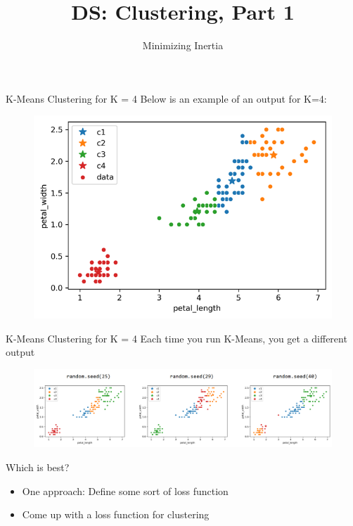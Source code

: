 \documentclass[aspectratio=169]{../latex_main/tntbeamer}  %
\title[Introduction]{DS: Clustering, Part 1}
\subtitle{Minimizing Inertia}
\begin{document}
	
	\maketitle
	\begin{frame}{K-Means Clustering for K = 4}
	    Below is an example of an output for K=4:
	    \begin{figure}
	        \centering
	        \includegraphics[scale=.75]{Bild21}
	    \end{figure}
	\end{frame}
	
	
	\begin{frame}{K-Means Clustering for K = 4}
	    Each time you run K-Means, you get a different output
	    \begin{figure}
	        \centering
	        \includegraphics[scale=.4]{Bild22}
	    \end{figure}
	    Which is best?
	    \begin{itemize}
	        \item One approach: Define some sort of loss function
	        \pause
	        \item Come up with a loss function for clustering
	    \end{itemize}
	\end{frame}
	
\end{document}
